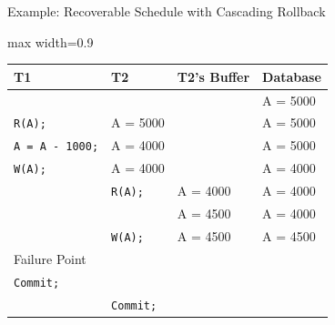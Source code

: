 \documentclass[aspectratio=169, xcolor=dvipsnames]{beamer}
\begin{document}
\begin{frame}{Example: Recoverable Schedule with Cascading Rollback}
    \begin{center}
        \begin{adjustbox}{max width=0.9\textwidth}
        \begin{tabular}{|l|l|l|l|}
        \hline
        \textbf{T1} & \textbf{T2} & \textbf{T2's Buffer} & \textbf{Database} \\ \hline
        & & & A = 5000 \\ \hline
        \texttt{R(A);} & A = 5000 & & A = 5000 \\ \hline
        \texttt{A = A - 1000;} & A = 4000 & & A = 5000 \\ \hline
        \texttt{W(A);} & A = 4000 & & A = 4000 \\ \hline
        & \texttt{R(A);} & A = 4000 & A = 4000 \\ \hline
        & & A = 4500 & A = 4000 \\ \hline
        & \texttt{W(A);} & A = 4500 & A = 4500 \\ \hline
        Failure Point & & & \\ \hline
        \texttt{Commit;} & & & \\ \hline
        & \texttt{Commit;} & & \\ \hline
        \end{tabular}
        \end{adjustbox}
    \end{center}
    \vspace{1em}
\end{frame}
\end{document}
